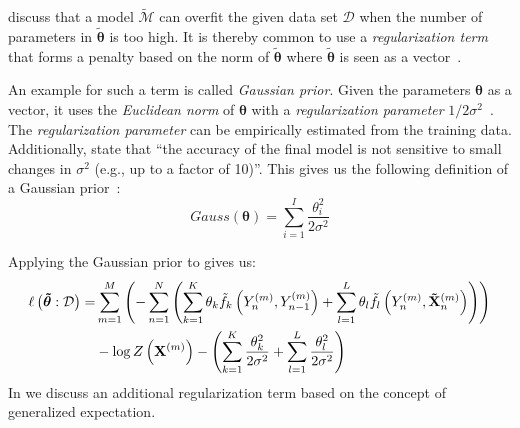 \bigskip

\citet{sutton2010introduction} discuss that a model $\tilde{\mathcal{M}}$ can overfit the given data set $\mathcal{D}$ when the number of parameters in $\bm{\tilde{\theta}}$ is too high.
It is thereby common to use a \textit{regularization term} that forms a penalty based on the norm of $\bm{\tilde{\theta}}$ where $\bm{\tilde{\theta}}$ is seen as a vector~\citep{koller2009probabilistic,sutton2010introduction}.

An example for such a term is called \textit{Gaussian prior}.
Given the parameters $\bm{\theta}$ as a vector, it uses the \textit{Euclidean norm} of $\bm{\theta}$ with a \textit{regularization parameter} $1/2\sigma^2$~\citep{sutton2010introduction}.
The \textit{regularization parameter} can be empirically estimated from the training data\citep{chen1999gaussian}.
Additionally, \citet{sutton2010introduction} state that ``the accuracy of the final model is not sensitive to small changes in $\sigma^2$ (e.g., up to a factor of 10)''\citep{sutton2010introduction}.
This gives us the following definition of a Gaussian prior~\citep{sutton2010introduction}:
\begin{equation}
  \label{equ:gaussian-prior}
  Gauss(\bm{\theta})=\sum_{i=1}^I\frac{\theta_i^2}{2\sigma^2}
\end{equation}

Applying the Gaussian prior to  gives us:
\begin{equation}
  \label{equ:log-likelihood-linear-chain-crf-log-linear-gaussian}
  \begin{split}
    \ell\left(\bm{\tilde{\theta}}:\mathcal{D}\right) = & \sum_{m=1}^M \left(-\sum_{n=1}^N \left(\sum_{k=1}^K\theta_k \tilde{f}_k\left(\vphantom{\tilde{X}}Y_n^{(m)},Y_{n-1}^{(m)}\right)+\sum_{l=1}^L\theta_l \tilde{f}_l\left(Y_n^{(m)},\mathbf{\tilde{X}}_n^{(m)}\right)\right)\right) \\
    & -\log Z\left(\mathbf{X}^{(m)}\right)-\left(\sum_{k=1}^K\frac{\theta_k^2}{2\sigma^2}+\sum_{l=1}^L\frac{\theta_l^2}{2\sigma^2}\right)
 \end{split}
\end{equation}
In  we discuss an additional regularization term based on the concept of \gls{generalized expectation}.

\bigskip

